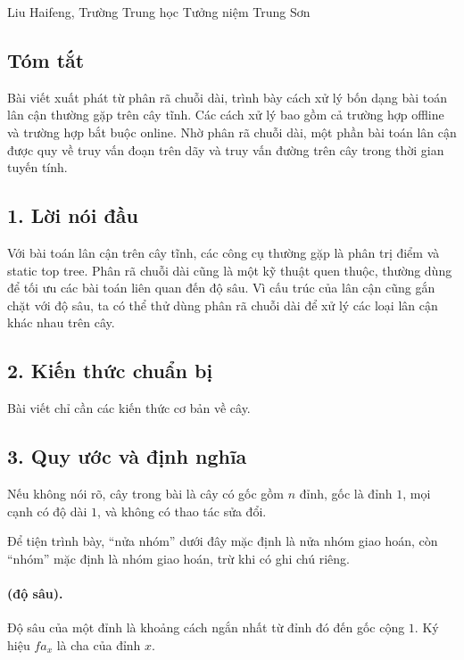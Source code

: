 \documentclass[11pt]{article}
\begin{document}
\begin{center}
Liu Haifeng, Trường Trung học Tưởng niệm Trung Sơn
\end{center}

\subsection*{Tóm tắt}

Bài viết xuất phát từ phân rã chuỗi dài, trình bày cách xử lý bốn dạng bài
toán lân cận thường gặp trên cây tĩnh. Các cách xử lý bao gồm cả trường hợp
offline và trường hợp bắt buộc online. Nhờ phân rã chuỗi dài, một phần bài toán
lân cận được quy về truy vấn đoạn trên dãy và truy vấn đường trên cây trong
thời gian tuyến tính.

\subsection*{1. Lời nói đầu}

Với bài toán lân cận trên cây tĩnh, các công cụ thường gặp là phân trị điểm và
static top tree. Phân rã chuỗi dài cũng là một kỹ thuật quen thuộc, thường dùng
để tối ưu các bài toán liên quan đến độ sâu. Vì cấu trúc của lân cận cũng gắn
chặt với độ sâu, ta có thể thử dùng phân rã chuỗi dài để xử lý các loại lân
cận khác nhau trên cây.

\subsection*{2. Kiến thức chuẩn bị}

Bài viết chỉ cần các kiến thức cơ bản về cây.

\subsection*{3. Quy ước và định nghĩa}

Nếu không nói rõ, cây trong bài là cây có gốc gồm \(n\) đỉnh, gốc là đỉnh
\(1\), mọi cạnh có độ dài \(1\), và không có thao tác sửa đổi.

Để tiện trình bày, ``nửa nhóm'' dưới đây mặc định là nửa nhóm giao hoán, còn
``nhóm'' mặc định là nhóm giao hoán, trừ khi có ghi chú riêng.

\paragraph{ (độ sâu).}
Độ sâu của một đỉnh là khoảng cách ngắn nhất từ đỉnh đó đến gốc cộng \(1\).
Ký hiệu \(fa_x\) là cha của đỉnh \(x\).
\end{document}
